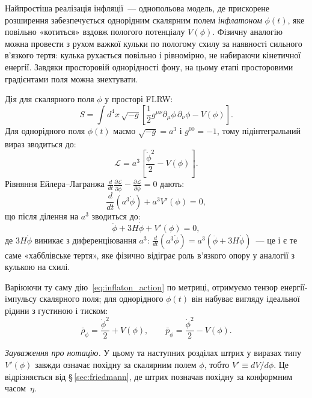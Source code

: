 \documentclass[12pt, a4paper]{article}
\begin{document}
Найпростіша реалізація інфляції~--- однопольова модель, де
прискорене розширення забезпечується однорідним скалярним полем
\emph{інфлатоном} $\phi(t)$, яке повільно «котиться» вздовж
пологого потенціалу $V(\phi)$. Фізичну аналогію можна провести з
рухом важкої кульки по пологому схилу за наявності сильного
в'язкого тертя: кулька рухається повільно і рівномірно, не
набираючи кінетичної енергії. Завдяки просторовій однорідності
фону, на цьому етапі просторовими градієнтами поля можна знехтувати.

Дія для скалярного поля $\phi$ у просторі FLRW:
\begin{equation}\label{eq:inflaton_action}
  S = \int d^4x\,\sqrt{-g}\left[\frac{1}{2}g^{\mu\nu}\partial_\mu\phi\,\partial_\nu\phi - V(\phi)\right].
\end{equation}
Для однорідного поля $\phi(t)$ маємо $\sqrt{-g} = a^3$ і $g^{00} = -1$,
тому підінтегральний вираз зводиться до:
\begin{equation*}
  \mathcal{L} = a^3\!\left[\frac{\dot{\phi}^2}{2} - V(\phi)\right].
\end{equation*}
Рівняння Ейлера--Лагранжа $\frac{d}{dt}\frac{\partial\mathcal{L}}{\partial\dot{\phi}} - \frac{\partial\mathcal{L}}{\partial\phi} = 0$ дають:
\begin{equation*}
  \frac{d}{dt}\!\left(a^3\dot{\phi}\right) + a^3 V'(\phi) = 0,
\end{equation*}
що після ділення на $a^3$ зводиться до:
\begin{equation}\label{eq:klein_gordon}
    \ddot{\phi} +3H\dot{\phi} + V'(\phi) = 0,
\end{equation}
де $3H\dot{\phi}$ виникає з диференціювання $a^3$:
$\frac{d}{dt}(a^3\dot{\phi}) = a^3(\ddot{\phi} + 3H\dot{\phi})$~---
це і є те саме «хабблівське тертя», яке фізично відіграє роль
в'язкого опору у аналогії з кулькою на схилі.

Варіюючи ту саму дію~\eqref{eq:inflaton_action} по метриці,
отримуємо тензор енергії-імпульсу скалярного поля; для
однорідного $\phi(t)$ він набуває вигляду ідеальної рідини
з густиною і тиском:
\begin{equation}\label{eq:inflaton_rho_p}
  \bar{\rho}_\phi = \frac{\dot{\phi}^2}{2} + V(\phi),
  \qquad
  \bar{p}_\phi   = \frac{\dot{\phi}^2}{2} - V(\phi).
\end{equation}


\noindent
\textit{Зауваження про нотацію.} У цьому та наступних розділах
штрих у виразах типу $V'(\phi)$ завжди означає похідну за
скалярним полем $\phi$, тобто $V' \equiv dV/d\phi$. Це відрізняється
від §\,\ref{sec:friedmann}, де штрих позначав похідну за конформним
часом~$\eta$.
\end{document}
